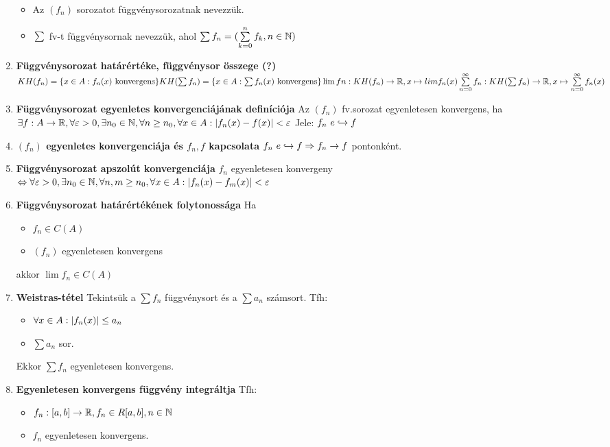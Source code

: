 \documentclass{article}
\begin{document}
\begin{enumerate}
\begin{itemize}
		\item Az $(f_n)$ sorozatot függvénysorozatnak nevezzük.
		\item$\sum$ fv-t függvénysornak nevezzük, ahol $\sum f_n=
		(\sum\limits_{k=0}^n f_k, n\in\mathbb{N})$
	\end{itemize}
	\item\textbf{Függvénysorozat határértéke, függvénysor összege (?)}\br
	$KH(f_n)=\{x\in A:f_n(x)\text{ konvergens}\}\br
	KH(\sum f_n)=\{x\in A:\sum f_n(x)\text{ konvergens}\}\br
	\lim fn:KH(f_n)\rightarrow\R,x\mapsto lim f_n(x)\br
	\sum\limits_{n=0}^\infty f_n:KH(\sum f_n)\rightarrow\R,x\mapsto
	\sum\limits_{n=0}^\infty f_n(x)$
	\item\textbf{Függvénysorozat egyenletes konvergenciájának definíciója}\br
	Az $(f_n)$ fv.sorozat egyenletesen konvergens, ha\br$\exists f:A\rightarrow
	\mathbb{R},\forall\varepsilon>0,\exists n_0\in\mathbb{N},\forall n\geq n_0,\forall x\in A:
	\abs{f_n(x) - f(x)}< \varepsilon$\br
	Jele: $f_n \text{ }e\hookrightarrow f$
	\item\textbf{$(f_n)$ egyenletes konvergenciája és $f_n,f$ kapcsolata}\br
	$f_n\text{ }e\hookrightarrow f
	\Rightarrow f_n\rightarrow f$ pontonként.
	\item\textbf{Függvénysorozat apszolút konvergenciája}\br
	$f_n$ egyenletesen konvergeny $\Leftrightarrow\forall\varepsilon>0,
	\exists n_0\in\mathbb{N},\forall n,m\geq n_0,\forall x\in A:\abs{f_n(x) - f_m(x)}< \varepsilon$
	\item\textbf{Függvénysorozat határértékének folytonossága}\br
	Ha \begin{itemize}
		\item $f_n\in C(A)$
		\item $(f_n)$ egyenletesen konvergens
	\end{itemize}
	akkor $\lim f_n\in C(A)$
	\item\textbf{Weistras-tétel}\br
	Tekintsük a $\sum f_n$ függvénysort és a $\sum a_n$ számsort. Tfh:
	\begin{itemize}
		\item $\forall x\in A:\abs{f_n(x)}\leq a_n$
		\item $\sum a_n$ sor.
	\end{itemize}
	Ekkor $\sum f_n$ egyenletesen konvergens.
	\item\textbf{Egyenletesen konvergens függvény integráltja}\br
	Tfh: \begin{itemize}
		\item $f_n:[a,b]\rightarrow\mathbb{R},f_n\in R[a,b],n\in\mathbb{N}$
		\item $f_n$ egyenletesen konvergens.
	\end{itemize}

\end{enumerate}
\end{document}

